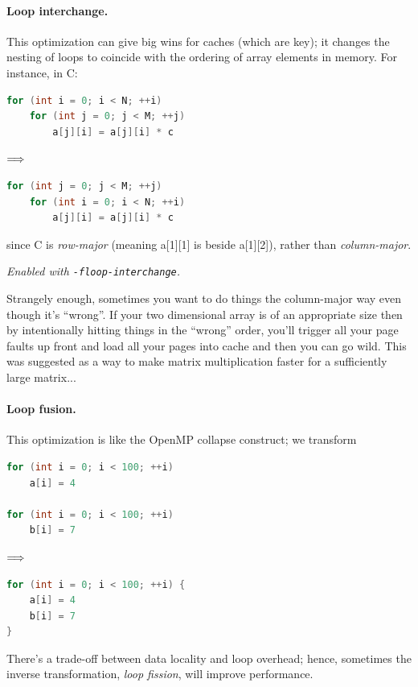 \documentclass[a4paper]{report}
\begin{document}
\paragraph{Loop interchange.} This optimization can give big wins
for caches (which are key); it changes the nesting of loops to
coincide with the ordering of array elements in memory. For instance,
in C:
\begin{center}
\vspace*{-1em}
\begin{minipage}{.3\textwidth}
  \begin{lstlisting}[language=C]
for (int i = 0; i < N; ++i)
    for (int j = 0; j < M; ++j)
        a[j][i] = a[j][i] * c
  \end{lstlisting}
  \end{minipage} $\Longrightarrow \hspace*{2em}$ \begin{minipage}{.4\textwidth}
  \begin{lstlisting}[language=C]
for (int j = 0; j < M; ++j)
    for (int i = 0; i < N; ++i)
        a[j][i] = a[j][i] * c
  \end{lstlisting}
  \end{minipage}
  \end{center}
  since C is \emph{row-major} (meaning a[1][1] is beside a[1][2]),
rather than \emph{column-major}.

\noindent
\emph{Enabled with {\tt -floop-interchange}.}

Strangely enough, sometimes you want to do things the column-major way even though it's ``wrong''. If your two dimensional array is of an appropriate size then by intentionally hitting things in the ``wrong'' order, you'll trigger all your page faults up front and load all your pages into cache and then you can go wild. This was suggested as a way to make matrix multiplication faster for a sufficiently large matrix...

\paragraph{Loop fusion.} This optimization is like the OpenMP collapse
construct; we transform
\begin{center}
\vspace*{-1em}
\begin{minipage}{.3\textwidth}
  \begin{lstlisting}[language=C]
for (int i = 0; i < 100; ++i)
    a[i] = 4

for (int i = 0; i < 100; ++i)
    b[i] = 7
  \end{lstlisting}
  \end{minipage} $\Longrightarrow \hspace*{2em}$ \begin{minipage}{.4\textwidth}
  \begin{lstlisting}[language=C]
for (int i = 0; i < 100; ++i) {
    a[i] = 4
    b[i] = 7
}
  \end{lstlisting}
  \end{minipage}
  \end{center}
There's a trade-off between data locality and loop overhead; hence,
sometimes the inverse transformation, \emph{loop fission}, will
improve performance.
\end{document}
